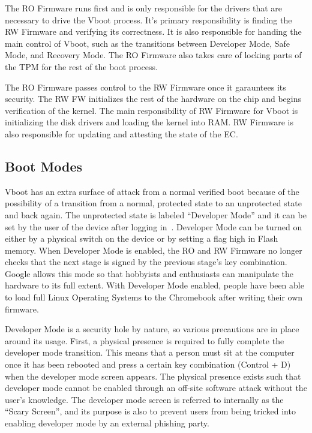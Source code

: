 \documentclass[../report.tex]{subfiles}
\begin{document}
The RO Firmware runs first and is only responsible for the drivers that are necessary to drive the Vboot process. 
It's primary responsibility is finding the RW Firmware and verifying its correctness. 
It is also responsible for handing the main control of Vboot, such as the transitions between Developer Mode, Safe Mode, and Recovery Mode.
The RO Firmware also takes care of locking parts of the TPM for the rest of the boot process.

The RO Firmware passes control to the RW Firmware once it garauntees its security.
The RW FW initializes the rest of the hardware on the chip and begins verification of the kernel.
The main responsibility of RW Firmware for Vboot is initializing the disk drivers and loading the kernel into RAM.
RW Firmware is also responsible for updating and attesting the state of the EC.

\subsection{Boot Modes}

Vboot has an extra surface of attack from a normal verified boot because of the possibility of a transition from a normal, protected state to an unprotected state and back again.
The unprotected state is labeled ``Developer Mode'' and it can be set by the user of the device after logging in~\cite{developer-mode}. 
Developer Mode can be turned on either by a physical switch on the device or by setting a flag high in Flash memory.
When Developer Mode is enabled, the RO and RW Firmware no longer checks that the next stage is signed by the previous stage's key combination.
Google allows this mode so that hobbyists and enthusiasts can manipulate the hardware to its full extent.
With Developer Mode enabled, people have been able to load full Linux Operating Systems to the Chromebook after writing their own firmware.

Developer Mode is a security hole by nature, so various precautions are in place around its usage. 
First, a physical presence is required to fully complete the developer mode transition. 
This means that a person must sit at the computer once it has been rebooted and press a certain key combination (Control + D) when the developer mode screen appears.
The physical presence exists such that developer mode cannot be enabled through an off-site software attack without the user's knowledge.
The developer mode screen is referred to internally as the ``Scary Screen'', and its purpose is also to prevent users from being tricked into enabling developer mode by an external phishing party.
\end{document}
